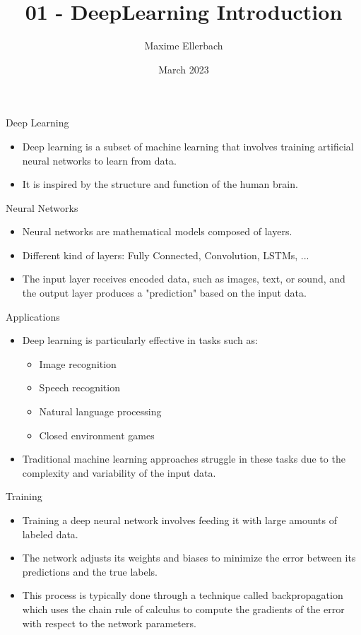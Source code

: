 \documentclass{beamer}
\title{01 - DeepLearning Introduction}
\author{Maxime Ellerbach}
\date{March 2023}
\begin{document}
\begin{frame}
    \titlepage
\end{frame}


\begin{frame}{Deep Learning}
    \begin{itemize}
    \item Deep learning is a subset of machine learning that involves training artificial neural networks to learn from data.
    \item It is inspired by the structure and function of the human brain.
    \end{itemize}
\end{frame}

\begin{frame}{Neural Networks}
    \begin{itemize}
    \item Neural networks are mathematical models composed of layers.
    \item Different kind of layers: Fully Connected, Convolution, LSTMs, ...
    \item The input layer receives encoded data, such as images, text, or sound, and the output layer produces a "prediction" based on the input data.
    \end{itemize}
\end{frame}

\begin{frame}{Applications}
    \begin{itemize}
    \item Deep learning is particularly effective in tasks such as:
    \begin{itemize}
    \item Image recognition
    \item Speech recognition
    \item Natural language processing
    \item Closed environment games
    \end{itemize}
    \item Traditional machine learning approaches struggle in these tasks due to the complexity and variability of the input data.
    \end{itemize}
\end{frame}

\begin{frame}{Training}
    \begin{itemize}
    \item Training a deep neural network involves feeding it with large amounts of labeled data.
    \item The network adjusts its weights and biases to minimize the error between its predictions and the true labels.
    \item This process is typically done through a technique called backpropagation which uses the chain rule of calculus to compute the gradients of the error with respect to the network parameters.
    \end{itemize}
\end{frame}
\end{document}
